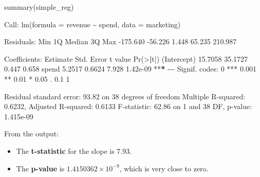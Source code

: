 \documentclass[
  11pt,
]{book}
\makeatletter
\newenvironment{Shaded}{}{}
\newcommand{\AttributeTok}[1]{#1}
\newcommand{\DecValTok}[1]{#1}
\newcommand{\ErrorTok}[1]{\textcolor[rgb]{0.21,0.21,0.21}{\textbf{#1}}}
\newcommand{\FloatTok}[1]{#1}
\newcommand{\FunctionTok}[1]{#1}
\newcommand{\NormalTok}[1]{#1}
\newcommand{\SpecialCharTok}[1]{\textcolor[rgb]{0.39,0.39,0.39}{#1}}
\newcommand{\StringTok}[1]{\textcolor[rgb]{0.39,0.39,0.39}{#1}}
\providecommand{\tightlist}{%
  \setlength{\itemsep}{0pt}\setlength{\parskip}{0pt}}
\newenvironment{kframe}{%
\medskip{}
\setlength{\fboxsep}{.8em}
 \def\at@end@of@kframe{}%
 \ifinner\ifhmode%
  \def\at@end@of@kframe{\end{minipage}}%
  \begin{minipage}{\columnwidth}%
 \fi\fi%
 \def\FrameCommand##1{\hskip\@totalleftmargin \hskip-\fboxsep
 \colorbox{shadecolor}{##1}\hskip-\fboxsep
     \hskip-\linewidth \hskip-\@totalleftmargin \hskip\columnwidth}%
 \MakeFramed {\advance\hsize-\width
   \@totalleftmargin\z@ \linewidth\hsize
   \@setminipage}}%
 {\par\unskip\endMakeFramed%
 \at@end@of@kframe}
\renewenvironment{Shaded}{\begin{kframe}}{\end{kframe}}
\theoremstyle{definition}
\theoremstyle{definition}
\theoremstyle{definition}
\theoremstyle{definition}
\theoremstyle{remark}
\makeatother
\begin{document}
\begin{Shaded}
\begin{Highlighting}[]
\FunctionTok{summary}\NormalTok{(simple\_reg)}
   
\NormalTok{   Call}\SpecialCharTok{:}
   \FunctionTok{lm}\NormalTok{(}\AttributeTok{formula =}\NormalTok{ revenue }\SpecialCharTok{\textasciitilde{}}\NormalTok{ spend, }\AttributeTok{data =}\NormalTok{ marketing)}
   
\NormalTok{   Residuals}\SpecialCharTok{:}
\NormalTok{        Min       }\DecValTok{1}\NormalTok{Q   Median       }\DecValTok{3}\NormalTok{Q      Max }
   \SpecialCharTok{{-}}\FloatTok{175.640}  \SpecialCharTok{{-}}\FloatTok{56.226}    \FloatTok{1.448}   \FloatTok{65.235}  \FloatTok{210.987} 
   
\NormalTok{   Coefficients}\SpecialCharTok{:}
\NormalTok{               Estimate Std. Error t value }\FunctionTok{Pr}\NormalTok{(}\SpecialCharTok{\textgreater{}}\ErrorTok{|}\NormalTok{t}\SpecialCharTok{|}\NormalTok{)    }
\NormalTok{   (Intercept)  }\FloatTok{15.7058}    \FloatTok{35.1727}   \FloatTok{0.447}    \FloatTok{0.658}    
\NormalTok{   spend         }\FloatTok{5.2517}     \FloatTok{0.6624}   \FloatTok{7.928} \FloatTok{1.42e{-}09} \SpecialCharTok{**}\ErrorTok{*}
   \SpecialCharTok{{-}{-}{-}}
\NormalTok{   Signif. codes}\SpecialCharTok{:}  \DecValTok{0} \StringTok{\textquotesingle{}***\textquotesingle{}} \FloatTok{0.001} \StringTok{\textquotesingle{}**\textquotesingle{}} \FloatTok{0.01} \StringTok{\textquotesingle{}*\textquotesingle{}} \FloatTok{0.05} \StringTok{\textquotesingle{}.\textquotesingle{}} \FloatTok{0.1} \StringTok{\textquotesingle{} \textquotesingle{}} \DecValTok{1}
   
\NormalTok{   Residual standard error}\SpecialCharTok{:} \FloatTok{93.82}\NormalTok{ on }\DecValTok{38}\NormalTok{ degrees of freedom}
\NormalTok{   Multiple R}\SpecialCharTok{{-}}\NormalTok{squared}\SpecialCharTok{:}  \FloatTok{0.6232}\NormalTok{, Adjusted R}\SpecialCharTok{{-}}\NormalTok{squared}\SpecialCharTok{:}  \FloatTok{0.6133} 
\NormalTok{   F}\SpecialCharTok{{-}}\NormalTok{statistic}\SpecialCharTok{:} \FloatTok{62.86}\NormalTok{ on }\DecValTok{1}\NormalTok{ and }\DecValTok{38}\NormalTok{ DF,  p}\SpecialCharTok{{-}}\NormalTok{value}\SpecialCharTok{:} \FloatTok{1.415e{-}09}
\end{Highlighting}
\end{Shaded}

From the output:

\begin{itemize}
\tightlist
\item
  The \textbf{t-statistic} for the slope is 7.93.\\
\item
  The \textbf{p-value} is \ensuremath{1.4150362\times 10^{-9}}, which is very close to zero.
\end{itemize}
\end{document}
